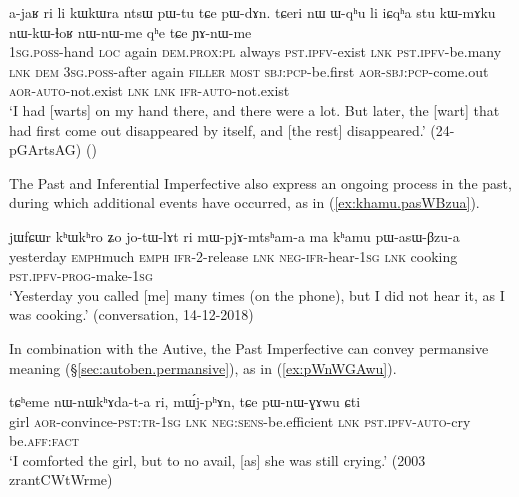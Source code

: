 \begin{exe}
\ex \label{ex:pWtu.pWdAn}
\gll a-jaʁ ri li kɯkɯra ntsɯ pɯ-tu tɕe pɯ-dɤn. tɕeri nɯ ɯ-qʰu li iɕqʰa stu kɯ-mɤku nɯ-kɯ-ɬoʁ nɯ-nɯ-me qʰe tɕe ɲɤ-nɯ-me \\
\textsc{1sg}.\textsc{poss}-hand \textsc{loc} again \textsc{dem}.\textsc{prox}:\textsc{pl} always \textsc{pst}.\textsc{ipfv}-exist \textsc{lnk} \textsc{pst}.\textsc{ipfv}-be.many \textsc{lnk} \textsc{dem} \textsc{3sg}.\textsc{poss}-after again \textsc{filler} \textsc{most} \textsc{sbj}:\textsc{pcp}-be.first \textsc{aor}-\textsc{sbj}:\textsc{pcp}-come.out \textsc{aor}-\textsc{auto}-not.exist \textsc{lnk} \textsc{lnk} \textsc{ifr}-\textsc{auto}-not.exist \\
\glt `I had [warts] on my hand there, and there were a lot. But later, the [wart] that had first come out disappeared by itself, and [the rest] disappeared.' (24-pGArtsAG)
()
\end{exe}

The Past and Inferential Imperfective also express an ongoing process in the past, during which additional events have occurred, as in (\ref{ex:khamu.pasWBzua}).

\begin{exe}
\ex \label{ex:khamu.pasWBzua}
\gll jɯfɕɯr kʰɯ\redp{}kʰro ʑo jo-tɯ-lɤt ri mɯ-pjɤ-mtsʰam-a ma kʰamu pɯ-asɯ-βzu-a   \\
yesterday \textsc{emph}\redp{}much \textsc{emph} \textsc{ifr}-2-release \textsc{lnk} \textsc{neg}-\textsc{ifr}-hear-\textsc{1sg} \textsc{lnk} cooking \textsc{pst}.\textsc{ipfv}-\textsc{prog}-make-\textsc{1sg} \\
\glt `Yesterday you called [me] many times (on the phone), but I did not hear it, as I was cooking.' (conversation, 14-12-2018)
\end{exe}


In combination with the Autive, the Past Imperfective can convey permansive meaning (§\ref{sec:autoben.permansive}), as in (\ref{ex:pWnWGAwu}).

\begin{exe}
\ex \label{ex:pWnWGAwu}
\gll tɕʰeme nɯ-nɯkʰɤda-t-a ri, mɯ́j-pʰɤn, tɕe pɯ-nɯ-ɣɤwu ɕti \\
girl \textsc{aor}-convince-\textsc{pst}:\textsc{tr}-\textsc{1sg} \textsc{lnk} \textsc{neg}:\textsc{sens}-be.efficient \textsc{lnk} \textsc{pst}.\textsc{ipfv}-\textsc{auto}-cry be.\textsc{aff}:\textsc{fact} \\
\glt `I comforted the girl, but to no avail, [as] she was still crying.' (2003 zrantCWtWrme)
\end{exe}

